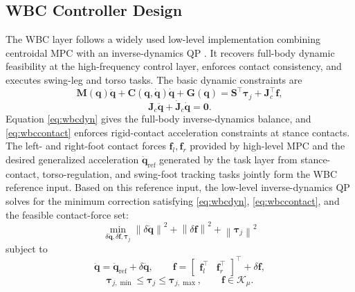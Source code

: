 \documentclass[5p,times]{elsarticle}
\begin{document}
\subsection{WBC Controller Design}
The WBC layer follows a widely used low-level implementation combining centroidal MPC with an inverse-dynamics QP \cite{ref36,ref55,ref63}. It recovers full-body dynamic feasibility at the high-frequency control layer, enforces contact consistency, and executes swing-leg and torso tasks. The basic dynamic constraints are
\begin{equation}
\bm M(\bm q)\ddot{\bm q}
+\bm C(\bm q,\dot{\bm q})\dot{\bm q}
+\bm G(\bm q)
=\bm S^\top\bm\tau_j+\bm J_c^\top\bm f,
\label{eq:wbcdyn}
\end{equation}
\begin{equation}
\bm J_c\ddot{\bm q}+\dot{\bm J}_c\dot{\bm q}=\bm 0.
\label{eq:wbccontact}
\end{equation}
Equation \eqref{eq:wbcdyn} gives the full-body inverse-dynamics balance, and \eqref{eq:wbccontact} enforces rigid-contact acceleration constraints at stance contacts. The left- and right-foot contact forces $\bm f_l,\bm f_r$ provided by high-level MPC and the desired generalized acceleration $\ddot{\bm q}_{\text{ref}}$ generated by the task layer from stance-contact, torso-regulation, and swing-foot tracking tasks jointly form the WBC reference input. Based on this reference input, the low-level inverse-dynamics QP solves for the minimum correction satisfying \eqref{eq:wbcdyn}, \eqref{eq:wbccontact}, and the feasible contact-force set:
\begin{equation}
\min_{\delta\ddot{\bm q},\delta\bm f,\bm\tau_j}
\left\|\delta\ddot{\bm q}\right\|^2
+\left\|\delta\bm f\right\|^2
+\left\|\bm\tau_j\right\|^2
\label{eq:wbcqp}
\end{equation}
subject to
\begin{equation}
\ddot{\bm q}=\ddot{\bm q}_{\text{ref}}+\delta\ddot{\bm q},\qquad
\bm f=\begin{bmatrix}\bm f_l^\top&\bm f_r^\top\end{bmatrix}^\top+\delta\bm f,
\end{equation}
\begin{equation}
\bm\tau_{j,\min}\le \bm\tau_j\le \bm\tau_{j,\max},\qquad \bm f\in\mathcal{K}_\mu.
\label{eq:wbcbound}
\end{equation}
\end{document}
